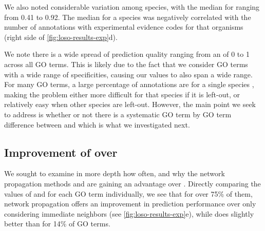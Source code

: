 We also noted considerable variation among species, with the median \fmax for \sinksource ranging from 0.41 to 0.92. The median \fmax for a species was negatively correlated with the number of annotations with experimental evidence codes for that organisms (right side of \cref{fig:loso-results-exp}d). 


We note there is a wide spread of prediction quality ranging from an \fmax of 0 to 1 across all GO terms. 
This is likely due to the fact that we consider GO terms with a wide range of specificities, causing our \fmax values to also span a wide range. 
For many GO terms, a large percentage of annotations are for a single species , making the problem either more difficult for that species if it is left-out, or relatively easy when other species are left-out. 
However, the main point we seek to address is whether or not there is a systematic GO term by GO term difference between \sinksource and \localplus which is what we investigated next. %


\subsection{Improvement of \sinksource over \localplus}  
\label{sec:loso-sinksource-localplus}
We sought to examine in more depth how often, and why the network propagation methods \sinksource and \genemania are gaining an advantage over \localplus.
Directly comparing the \fmax values of \sinksource and \localplus for each GO term individually, we see that for over 75\% of them, network propagation offers an improvement in prediction performance over only considering immediate neighbors (see \cref{fig:loso-results-exp}e), while \localplus does slightly better than \sinksource for 14\% of GO terms.

